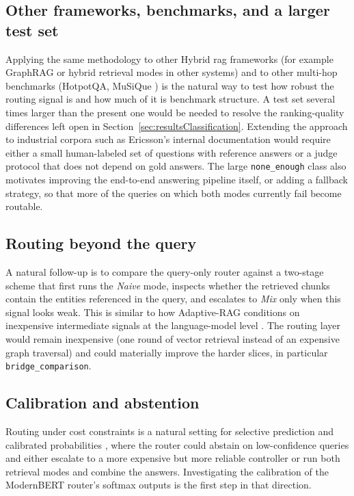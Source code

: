 \documentclass[english, bibtex]{kththesis}               %
\numberwithin{listing}{chapter}
\begin{document}
\subsection{Other frameworks, benchmarks, and a larger test set} Applying the same methodology to other Hybrid \gls{rag} frameworks (for example GraphRAG \cite{edge2024graphrag} or hybrid retrieval modes in other systems) and to other multi-hop benchmarks (HotpotQA, MuSiQue \cite{yang2018hotpotqa,trivedi2022musique}) is the natural way to test how robust the routing signal is and how much of it is benchmark structure. A test set several times larger than the present one would be needed to resolve the ranking-quality differences left open in Section~\ref{sec:resultsClassification}. Extending the approach to industrial corpora such as Ericsson's internal documentation would require either a small human-labeled set of questions with reference answers or a judge protocol that does not depend on gold answers. The large \texttt{none\_enough} class also motivates improving the end-to-end answering pipeline itself, or adding a fallback strategy, so that more of the queries on which both modes currently fail become routable.

\subsection{Routing beyond the query} A natural follow-up is to compare the query-only router against a two-stage scheme that first runs the \emph{Naive} mode, inspects whether the retrieved chunks contain the entities referenced in the query, and escalates to \emph{Mix} only when this signal looks weak. This is similar to how Adaptive-RAG conditions on inexpensive intermediate signals at the language-model level \cite{jeong2024adaptiverag}. The routing layer would remain inexpensive (one round of vector retrieval instead of an expensive graph traversal) and could materially improve the harder slices, in particular \texttt{bridge\_comparison}.

\subsection{Calibration and abstention} Routing under cost constraints is a natural setting for selective prediction \cite{geifman2017selective} and calibrated probabilities \cite{guo2017calibration}, where the router could abstain on low-confidence queries and either escalate to a more expensive but more reliable controller or run both retrieval modes and combine the answers. Investigating the calibration of the ModernBERT router's softmax outputs is the first step in that direction.
\end{document}
